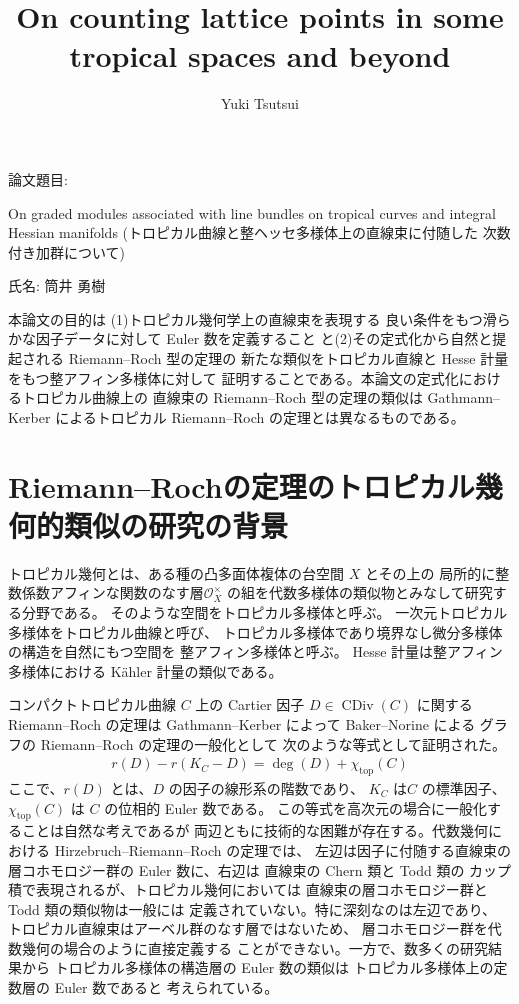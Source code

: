 \documentclass[a4paper,dvipdfmx,reqno,12pt]{amsart}
\title{On counting lattice points in some tropical spaces and beyond
}
\author[Y. Tsutsui]{Yuki Tsutsui}
\theoremstyle{definition}
\newcommand{\opn}[1]{\operatorname{#1}}
\numberwithin{equation}{section}
\begin{document}
論文題目:

On graded modules associated with line bundles on 
tropical curves and integral Hessian manifolds
(トロピカル曲線と整ヘッセ多様体上の直線束に付随した
次数付き加群について)

氏名: 筒井 勇樹

本論文の目的は (1)トロピカル幾何学上の直線束を表現する
良い条件をもつ滑らかな因子データに対して Euler 数を定義すること
と(2)その定式化から自然と提起される Riemann--Roch 型の定理の
新たな類似をトロピカル直線と Hesse 計量をもつ整アフィン多様体に対して
証明することである。本論文の定式化におけるトロピカル曲線上の
直線束の Riemann--Roch 型の定理の類似は Gathmann--Kerber
によるトロピカル Riemann--Roch の定理とは異なるものである。

\section{Riemann--Rochの定理のトロピカル幾何的類似の研究の背景}

トロピカル幾何とは、ある種の凸多面体複体の台空間 $X$ とその上の
局所的に整数係数アフィンな関数のなす層$\mathcal{O}_X^{\times}$
の組を代数多様体の類似物とみなして研究する分野である。
そのような空間をトロピカル多様体と呼ぶ。
一次元トロピカル多様体をトロピカル曲線と呼び、
トロピカル多様体であり境界なし微分多様体の構造を自然にもつ空間を
整アフィン多様体と呼ぶ。
Hesse 計量は整アフィン多様体における
K\"ahler 計量の類似である。

コンパクトトロピカル曲線 $C$ 上の Cartier 因子 
$D\in \opn{CDiv}(C)$
に関する Riemann--Roch の定理は
Gathmann--Kerber によって Baker--Norine による
グラフの Riemann--Roch の定理の一般化として
次のような等式として証明された。
\begin{align}
r(D)-r(K_C-D)=\opn{deg}(D)+\chi_{\mathrm{top}}(C)
\end{align}
ここで、$r(D)$ とは、$D$ の因子の線形系の階数であり、
$K_C$ は$C$ の標準因子、$\chi_{\mathrm{top}}(C)$ は
$C$ の位相的 Euler 数である。
この等式を高次元の場合に一般化することは自然な考えであるが
両辺ともに技術的な困難が存在する。代数幾何における
Hirzebruch--Riemann--Roch の定理では、
左辺は因子に付随する直線束の層コホモロジー群の
Euler 数に、右辺は 直線束の Chern 類と Todd 類の
カップ積で表現されるが、トロピカル幾何においては
直線束の層コホモロジー群と Todd 類の類似物は一般には
定義されていない。特に深刻なのは左辺であり、
トロピカル直線束はアーベル群のなす層ではないため、
層コホモロジー群を代数幾何の場合のように直接定義する
ことができない。一方で、数多くの研究結果から
トロピカル多様体の構造層の Euler 数の類似は
トロピカル多様体上の定数層の Euler 数であると
考えられている。
\end{document}
